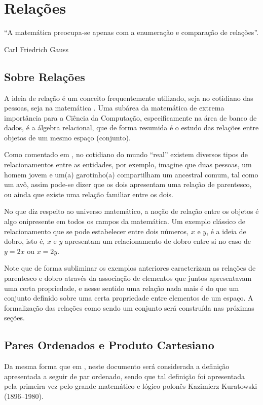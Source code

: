 \chapter{Relações}\label{cap:Relations}

\epigraph{``A matemática preocupa-se apenas com a enumeração e comparação de relações''.}{Carl Friedrich Gauss}

\section{Sobre Relações}\label{sec:SobreRelacoes}

A ideia de relação é um conceito frequentemente utilizado, seja no cotidiano das pessoas, seja na matemática \cite{barreto}. Uma subárea da matemática de extrema importância para a Ciência da Computação, especificamente na área de banco de dados, é a álgebra relacional, que de forma resumida é o estudo das relações entre objetos de um mesmo espaço (conjunto).

Como comentado em \cite{epp1990}, no cotidiano do mundo ``real'' existem diversos tipos de relacionamentos entre as entidades, por exemplo, imagine que duas pessoas, um homem jovem e um(a) garotinho(a) compartilham um ancestral comum, tal como um avô, assim pode-se dizer que os dois apresentam uma relação de parentesco, ou ainda que existe uma relação familiar entre os dois.

No que diz respeito ao universo matemático, a noção de relação entre os objetos é algo onipresente em todos os campos da matemática. Um exemplo clássico de relacionamento que se pode estabelecer entre dois números, $x$ e $y$, é a ideia de dobro, isto é, $x$ e $y$ apresentam um relacionamento de dobro entre si no caso de $y = 2x$ ou $x = 2y$.

Note que de forma subliminar os exemplos anteriores caracterizam as relações de parentesco e dobro através da associação de elementos que juntos apresentavam uma certa propriedade, e nesse sentido uma relação nada mais é do que um conjunto definido sobre uma certa propriedade entre elementos de um espaço. A formalização das relações como sendo um conjunto será construída nas próximas seções.

\section{Pares Ordenados e Produto Cartesiano}\label{sec:ParesOrdenadosProdutoCartesiano}

Da mesma forma que em \cite{abe1991-TC}, neste documento será considerada a definição apresentada a seguir de par ordenado, sendo que tal definição foi apresentada pela primeira vez pelo grande matemático e lógico polonês Kazimierz Kuratowski (1896--1980).


